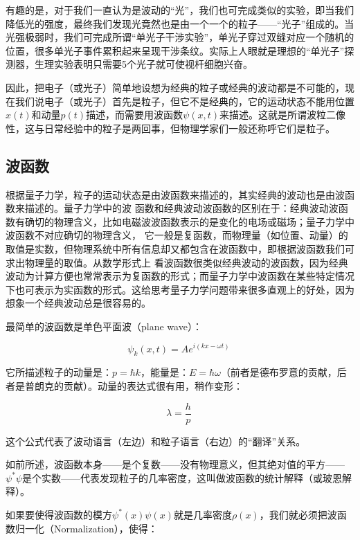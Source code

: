 有趣的是，对于我们一直认为是波动的“光”，我们也可完成类似的实验，即当我们降低光的强度，最终我们发现光竟然也是由一个一个的粒子——“光子”组成的。当光强极弱时，我们可完成所谓“单光子干涉实验”，单光子穿过双缝对应一个随机的位置，很多单光子事件累积起来呈现干涉条纹。实际上人眼就是理想的“单光子”探测器，生理实验表明只需要5个光子就可使视杆细胞兴奋。

因此，把电子（或光子）简单地设想为经典的粒子或经典的波动都是不可能的，现在我们说电子（或光子）首先是粒子，但它不是经典的，它的运动状态不能用位置$x(t)$和动量$p(t)$描述，而需要用波函数$\psi(x,t)$来描述。这就是所谓波粒二像性，这与日常经验中的粒子是两回事，但物理学家们一般还称呼它们是粒子。

\subsection{波函数}

根据量子力学，粒子的运动状态是由波函数来描述的，其实经典的波动也是由波函数来描述的。量子力学中的波
函数和经典波动波函数的区别在于：经典波动波函数有确切的物理含义，比如电磁波波函数表示的是变化的电场或磁场；量子力学中波函数不对应确切的物理含义，
它一般是复函数，而物理量（如位置、动量）的取值是实数，但物理系统中所有信息却又都包含在波函数中，即根据波函数我们可求出物理量的取值。从数学形式上
看波函数很类似经典波动的波函数，因为经典波动为计算方便也常常表示为复函数的形式；而量子力学中波函数在某些特定情况下也可表示为实函数的形式。这给思考量子力学问题带来很多直观上的好处，因为想象一个经典波动总是很容易的。

最简单的波函数是单色平面波（plane wave）：

\begin{equation}
\psi_k (x, t) = A e^{i(kx -\omega t)}~
\end{equation}

它所描述粒子的动量是：$p = \hbar k$，能量是：$E = \hbar
\omega$（前者是德布罗意的贡献，后者是普朗克的贡献）。动量的表达式很有用，稍作变形：

\begin{equation}
\lambda = \frac{h}{p}~
\end{equation}

这个公式代表了波动语言（左边）和粒子语言（右边）的“翻译”关系。

如前所述，波函数本身——是个复数——没有物理意义，但其绝对值的平方——$\psi^* \psi $是个实数——代表发现粒子的几率密度，这叫做波函数的统计解释（或玻恩解释）。

如果要使得波函数的模方$\psi^*(x) \psi(x)$就是几率密度$\rho(x)$，我们就必须把波函数归一化（Normalization），使得：

